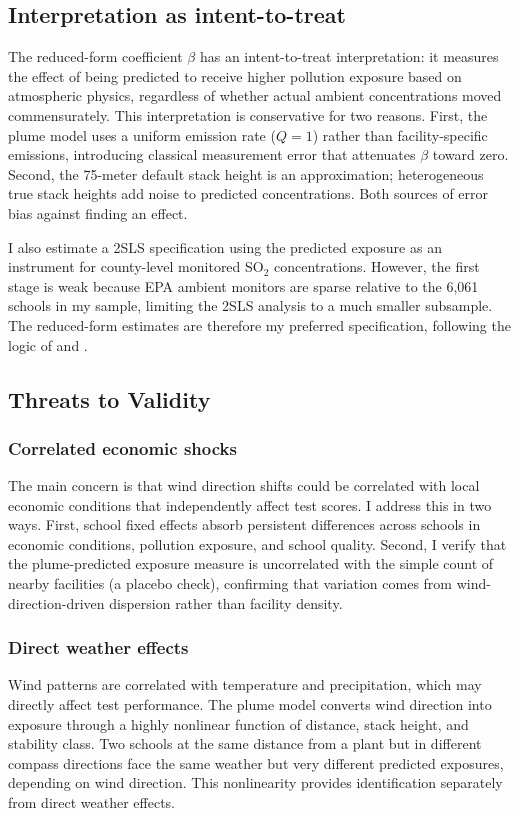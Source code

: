\documentclass[12pt]{article}
\begin{document}
\subsection{Interpretation as intent-to-treat}

The reduced-form coefficient $\beta$ has an intent-to-treat interpretation: it measures the effect of being predicted to receive higher pollution exposure based on atmospheric physics, regardless of whether actual ambient concentrations moved commensurately. This interpretation is conservative for two reasons. First, the plume model uses a uniform emission rate ($Q = 1$) rather than facility-specific emissions, introducing classical measurement error that attenuates $\beta$ toward zero. Second, the 75-meter default stack height is an approximation; heterogeneous true stack heights add noise to predicted concentrations. Both sources of error bias against finding an effect.

I also estimate a 2SLS specification using the predicted exposure as an instrument for county-level monitored SO$_2$ concentrations. However, the first stage is weak because EPA ambient monitors are sparse relative to the 6,061 schools in my sample, limiting the 2SLS analysis to a much smaller subsample. The reduced-form estimates are therefore my preferred specification, following the logic of \citet{olken2009} and \citet{deryugina2019}.

\subsection{Threats to Validity}

\subsubsection*{Correlated economic shocks} The main concern is that wind direction shifts could be correlated with local economic conditions that independently affect test scores. I address this in two ways. First, school fixed effects absorb persistent differences across schools in economic conditions, pollution exposure, and school quality. Second, I verify that the plume-predicted exposure measure is uncorrelated with the simple count of nearby facilities (a placebo check), confirming that variation comes from wind-direction-driven dispersion rather than facility density.

\subsubsection*{Direct weather effects} Wind patterns are correlated with temperature and precipitation, which may directly affect test performance. The plume model converts wind direction into exposure through a highly nonlinear function of distance, stack height, and stability class. Two schools at the same distance from a plant but in different compass directions face the same weather but very different predicted exposures, depending on wind direction. This nonlinearity provides identification separately from direct weather effects.
\end{document}
